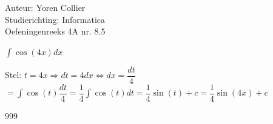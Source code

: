 \documentclass[a4paper]{article}
\newcommand{\asa}{\Leftrightarrow} %
\newcommand{\adR}{\Rightarrow} %
\newcommand{\Lh}{\left(} %
\newcommand{\Rh}{\right)}
\newcommand{\intgrl}{\displaystyle\int} %
\begin{document}
\noindent \large Auteur: Yoren Collier \\
\noindent \large Studierichting: Informatica\\
\noindent \large Oefeningenreeks 4A nr. 8.5\\

\medskip

\normalsize

$ \intgrl \cos \Lh 4x \Rh dx $

Stel: $t = 4x \adR dt = 4dx \asa dx = \dfrac{dt}{4}$\\

$= \intgrl \cos \Lh t \Rh \dfrac{dt}{4} = \dfrac{1}{4} \intgrl \cos \Lh t \Rh dt = \dfrac{1}{4} \sin \Lh t \Rh +c = \dfrac{1}{4} \sin \Lh 4x \Rh +c$\\

\begin{thebibliography}{999}
\end{thebibliography}
\end{document}
